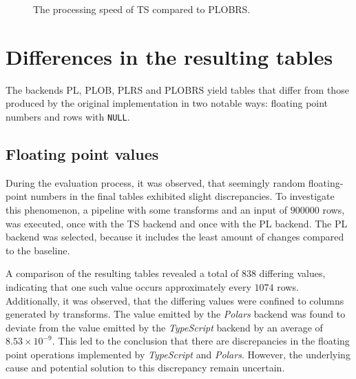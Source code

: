\begin{figure}
	\begin{center}
		\caption{The processing speed of TS compared to PLOBRS.}
		\label{fig:plot:factor}
	\end{center}
\end{figure}

\pagebreak
\section{Differences in the resulting tables}
\label{eval:diffs}
The backends PL, PLOB, PLRS and PLOBRS yield tables that differ from those produced by the original implementation in two notable ways:
floating point numbers and rows with \Verb|NULL|.

\subsection{Floating point values}
During the evaluation process, it was observed, that seemingly random floating-point numbers in the final tables exhibited slight discrepancies.
To investigate this phenomenon, a pipeline with some transforms and an input of $900 000$ rows, was executed, once with the TS backend and once with the PL backend.
The PL backend was selected, because it includes the least amount of changes compared to the baseline.

A comparison of the resulting tables revealed a total of $838$ differing values, indicating that one such value occurs approximately every $1074$ rows.
Additionally, it was observed, that the differing values were confined to columns generated by transforms.
The value emitted by the \emph{Polars} backend was found to deviate from the value emitted by the \emph{TypeScript} backend by an average of $8.53{\times}10^{-9}$.
This led to the conclusion that there are discrepancies in the floating point operations implemented by \emph{TypeScript} and \emph{Polars}.
However, the underlying cause and potential solution to this discrepancy remain uncertain.

